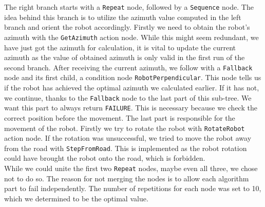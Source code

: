     The right branch starts with a \texttt{Repeat} node, followed by a \texttt{Sequence} node. The idea behind this branch is to utilize the azimuth value computed in the left branch and orient the robot accordingly. Firstly we need to obtain the robot's azimuth with the \texttt{GetAzimuth} action node. While this might seem redundant, we have just got the azimuth for calculation, it is vital to update the current azimuth as the value of obtained azimuth is only valid in the first run of the second branch. After receiving the current azimuth, we follow with a \texttt{Fallback} node and its first child, a condition node \texttt{RobotPerpendicular}. This node tells us if the robot has achieved the optimal azimuth we calculated earlier. If it has not, we continue, thanks to the \texttt{Fallback} node to the last part of this sub-tree. We want this part to always return \texttt{FAILURE}. This is necessary because we check the correct position before the movement. The last part is responsible for the movement of the robot. Firstly we try to rotate the robot with \texttt{RotateRobot} action node. If the rotation was unsuccessful, we tried to move the robot away from the road with \texttt{StepFromRoad}. This is implemented as the robot rotation could have brought the robot onto the road, which is forbidden.\\
    While we could unite the first two \texttt{Repeat} nodes, maybe even all three, we chose not to do so. The reason for not merging the nodes is to allow each algorithm part to fail independently. The number of repetitions for each node was set to 10, which we determined to be the optimal value.
